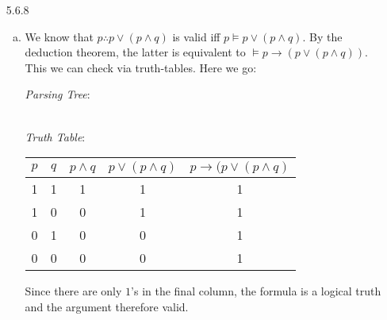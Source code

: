 \begin{enumerate}		

		\item[5.6.8]
		
		\begin{enumerate}[(a)]
		
			\item We know that $p\therefore p\lor (p\land q)$ is valid iff $p\vDash p\lor (p\land q)$. By the deduction theorem, the latter is equivalent to $\vDash p\to( p\lor (p\land q))$. This we can check via truth-tables. Here we go:
			
			\begin{center}
			\emph{Parsing Tree}:\\[1ex]
			
				\\[2ex]
				
			\emph{Truth Table}:\\[1ex]
			
			\begin{tabular}{c c | c c c}
			 $p$ & $q$ & $p\land q$ & $p\lor (p\land q)$ & $p\to (p\lor (p\land q)$\\\hline
			 
			 1 & 1 & 1 & 1& 1\\
			 1 & 0& 0& 1& 1 \\
			 0 & 1& 0& 0& 1\\
			 0& 0 & 0& 0& 1\\
			 
			
			\end{tabular}
			
			\end{center}
		
		Since there are only $1$'s in the final column, the formula is a logical truth and the argument therefore valid.


	\end{enumerate}
	
	

	

\end{enumerate}
	

